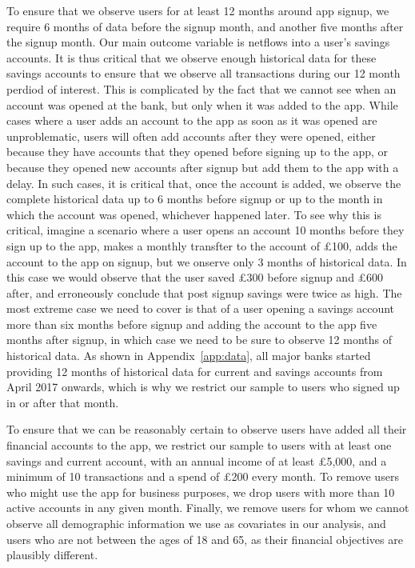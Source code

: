 To ensure that we observe users for at least 12 months around app signup, we
require 6 months of data before the signup month, and another five months after
the signup month. Our main outcome variable is netflows into a user's savings
accounts. It is thus critical that we observe enough historical data for these
savings accounts to ensure that we observe all transactions during our 12 month
perdiod of interest. This is complicated by the fact that we cannot see when an
account was opened at the bank, but only when it was added to the app. While
cases where a user adds an account to the app as soon as it was opened are
unproblematic, users will often add accounts after they were opened, either
because they have accounts that they opened before signing up to the app, or
because they opened new accounts after signup but add them to the app with a
delay. In such cases, it is critical that, once the account is added, we
observe the complete historical data up to 6 months before signup or up to the
month in which the account was opened, whichever happened later. To see why
this is critical, imagine a scenario where a user opens an account 10 months
before they sign up to the app, makes a monthly transfter to the account of
\pounds100, adds the account to the app on signup, but we onserve only 3 months
of historical data. In this case we would observe that the user saved
\pounds300 before signup and \pounds600 after, and erroneously conclude that
post signup savings were twice as high. The most extreme case we need to cover
is that of a user opening a savings account more than six months before signup
and adding the account to the app five months after signup, in which case we
need to be sure to observe 12 months of historical data. As shown in
Appendix~\ref{app:data}, all major banks started providing 12 months of
historical data for current and savings accounts from April 2017 onwards, which
is why we restrict our sample to users who signed up in or after that month.

To ensure that we can be reasonably certain to observe users have added all
their financial accounts to the app, we restrict our sample to users with at
least one savings and current account, with an annual income of at least
\pounds5,000, and a minimum of 10 transactions and a spend of \pounds200 every
month. To remove users who might use the app for business purposes, we drop
users with more than 10 active accounts in any given month. Finally, we remove
users for whom we cannot observe all demographic information we use as
covariates in our analysis, and users who are not between the ages of 18 and
65, as their financial objectives are plausibly different.


